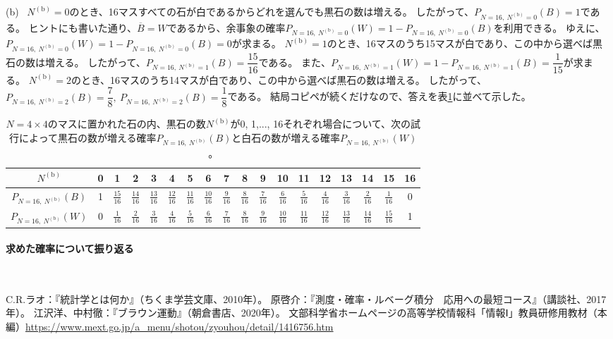 \documentclass[luatexja,fontsize=12pt]{jlreq}\usepackage{ifthen}\newcounter{enlarge}\setcounter{enlarge}{1}
\begin{document}
(b)~
$N^\mathrm{(b)} = 0$のとき、16マスすべての石が白であるからどれを選んでも黒石の数は増える。
したがって、$P_{N = 16,~N^\mathrm{(b)} = 0} (B) = 1$である。
ヒントにも書いた通り、$\overline{B} = W$であるから、余事象の確率$P_{N = 16,~N^\mathrm{(b)} = 0} (W) = 1 - P_{N = 16,~N^\mathrm{(b)} = 0} (B)$を利用できる。
ゆえに、$P_{N = 16,~N^\mathrm{(b)} = 0} (W) = 1 - P_{N = 16,~N^\mathrm{(b)} = 0} (B) = 0$が求まる。
$N^\mathrm{(b)} = 1$のとき、16マスのうち15マスが白であり、この中から選べば黒石の数は増える。
したがって、$P_{N = 16,~N^\mathrm{(b)} = 1} (B) = \dfrac{15}{16}$である。
また、$P_{N = 16,~N^\mathrm{(b)} = 1} (W) = 1 - P_{N = 16,~N^\mathrm{(b)} = 1} (B) = \dfrac{1}{15}$が求まる。
$N^\mathrm{(b)} = 2$のとき、16マスのうち14マスが白であり、この中から選べば黒石の数は増える。
したがって、$P_{N = 16,~N^\mathrm{(b)} = 2} (B) = \dfrac{7}{8} ,~ P_{N = 16,~N^\mathrm{(b)} = 2} (B) = \dfrac{1}{8}$である。
結局コピペが続くだけなので、答えを表\ref{t:1}に並べて示した。
\begin{table}[]
\caption{$N = 4 \times 4$のマスに置かれた石の内、黒石の数$N^\mathrm{(b)}$が0, 1,..., 16それぞれ場合について、次の試行によって黒石の数が増える確率$P_{N = 16,~N^\mathrm{(b)}} (B)$と白石の数が増える確率$P_{N = 16,~N^\mathrm{(b)}} (W)$。}
\label{t:1}
\centering
\begin{tabular}{cccccccccccccccccc} \hline
$N^\mathrm{(b)}$ & 0 & 1 & 2 & 3 & 4 & 5 & 6 & 7 & 8 & 9 & 10 & 11 & 12 & 13 & 14 & 15 & 16 \\ \hline 
$P_{N = 16,~N^\mathrm{(b)}} (B)$ & 1 & $\frac{15}{16}$ & $\frac{14}{16}$ & $\frac{13}{16}$ & $\frac{12}{16}$ & $\frac{11}{16}$ & $\frac{10}{16}$ & $\frac{9}{16}$ & $\frac{8}{16}$ & $\frac{7}{16}$ & $\frac{6}{16}$ & $\frac{5}{16}$ & $\frac{4}{16}$ & $\frac{3}{16}$ & $\frac{2}{16}$ & $\frac{1}{16}$ & 0 \\
$P_{N = 16,~N^\mathrm{(b)}} (W)$ & 0 & $\frac{1}{16}$ & $\frac{2}{16}$ & $\frac{3}{16}$ & $\frac{4}{16}$ & $\frac{5}{16}$ & $\frac{6}{16}$ & $\frac{7}{16}$ & $\frac{8}{16}$ & $\frac{9}{16}$ & $\frac{10}{16}$ & $\frac{11}{16}$ & $\frac{12}{16}$ & $\frac{13}{16}$ & $\frac{14}{16}$ & $\frac{15}{16}$ & 1 \\ \hline 
\end{tabular}    
\end{table}

\paragraph{求めた確率について振り返る}\mbox{}\\
\indent

\begin{thebibliography}{99}
C.R.ラオ：『統計学とは何か』（ちくま学芸文庫、2010年）。
 原啓介：『測度・確率・ルベーグ積分　応用への最短コース』（講談社、2017年）。
 江沢洋、中村徹：『ブラウン運動』（朝倉書店、2020年）。
 文部科学省ホームページの高等学校情報科「情報Ⅰ」教員研修用教材（本編）\url{https://www.mext.go.jp/a_menu/shotou/zyouhou/detail/1416756.htm}
\end{thebibliography}
\end{document}
